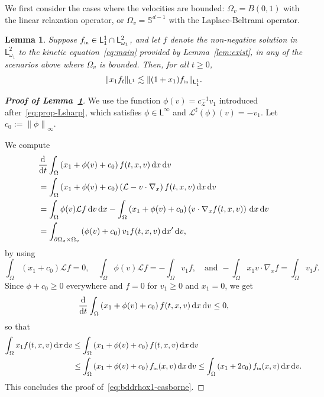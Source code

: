 \documentclass[11pt]{amsart}
\newtheorem{lemma}[theorem]{Lemma}
\theoremstyle{definition}
\theoremstyle{remark}
\numberwithin{equation}{section}
\def\LL{{\mathcal L}}
\newcommand{\dd}{{\, \mathrm d}}
\newcommand{\dt}{\frac{{\rm d}}{{\rm d}t}}
\newcommand{\init}{\text{{\tiny {\rm in}}}}
\newcommand{\sfL}{\mathsf{L}}
\begin{document}
We first consider the cases where the velocities are bounded: $\Omega_v = B(0,1)$ with the linear relaxation operator, or $\Omega_v = \mathbb S^{d-1}$ with the Laplace-Beltrami operator.

\begin{lemma}\label{lem:moments_bdd_vel}
  Suppose $f_\init \in \sfL_1^{1} \cap \sfL_{\omega_1}^{2}$, and let $f$ denote the non-negative solution in $\sfL_{\omega_1}^2$ to the kinetic equation~\eqref{eq:main} provided by Lemma~\ref{lem:exist}, in any of the scenarios above where $\Omega_v$ is bounded. Then, for all $t \ge 0$,
  \begin{equation}
    \label{eq:bddrhox1-casborne}
    \| x_1 f_t \|_{\sfL^{1}} \lesssim \| (1+x_1) f_\init \|_{\sfL^{1}_1}.
  \end{equation}
\end{lemma}

\begin{proof}[{\bf Proof of Lemma~\ref{lem:moments_bdd_vel}}]
  We use the  function $\phi(v) = c_\LL^{-1} v_1$ introduced after~\eqref{eq:prop-Lsharp}, which satisfies $\phi \in \sfL^{\infty}$  and $\mathcal{L}^\sharp \left(\phi\right) (v) = -v_1$. Let $c_0 := \left\| \phi \right\|_\infty$.

  We compute
  \begin{align*}
    & \dt \int_\Omega \left( x_1 + \phi(v) + c_0 \right) f(t,x,v) \dd x \dd v \\
    &= \int_{\Omega} \left( x_1 + \phi(v) + c_0 \right) \left( \mathcal{L} - v \cdot \nabla_x\right) f(t,x,v) \dd x \dd v  \\
    &= \int_{\Omega} \phi(v) \mathcal{L}f \dd v \dd x - \int_{ \Omega} \left( x_1 + \phi(v) + c_0 \right) \left(  v \cdot \nabla_x  f(t,x,v) \right)\dd x \dd v \\
    & =  \int_{\partial \Omega_x \times \Omega_v} \left(\phi(v) + c_0 \right) v_1 f(t,x,v) \dd x' \dd v ,
  \end{align*}
  by using
  \begin{equation*}
    \int_\Omega (x_1+c_0) \mathcal Lf =0, \quad \int_\Omega \phi(v) \mathcal Lf = - \int_\Omega v_1 f, \quad \text{and } - \int_\Omega x_1 v \cdot \nabla_x f = \int_\Omega v_1 f.
  \end{equation*}
  Since $\phi+c_0 \ge 0$ everywhere and $f=0$ for $v_1 \ge 0$ and $x_1=0$, we get
  \begin{equation*}
    \dt \int_\Omega \left(x_1 + \phi(v) + c_0  \right) f(t,x,v) \dd x \dd v \le 0,
  \end{equation*}
  so that
  \begin{align*}
    \int_\Omega x_1 f(t,x,v) \dd x \dd v
    & \le \int_\Omega \left(x_1 + \phi(v) + c_0  \right) f(t,x,v) \dd x \dd v \\
    & \le \int_\Omega \left(x_1 + \phi(v) + c_0  \right) f_\init(x,v) \dd x \dd v \le \int_\Omega \left( x_1 + 2c_0 \right) f_\init(x,v) \dd x \dd v.
  \end{align*}
  This concludes the proof of~\eqref{eq:bddrhox1-casborne}.
\end{proof}
\end{document}
